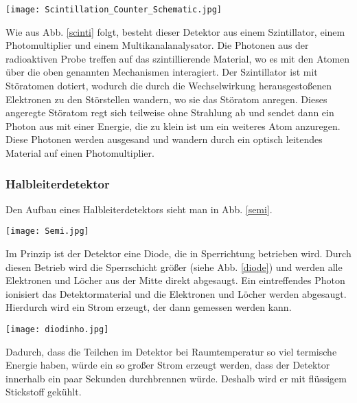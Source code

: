 \documentclass[12pt,a4paper,titlepage]{article}
\begin{document}
\begin{figure*}[h!]
	\centering
	\texttt{[image: Scintillation\_Counter\_Schematic.jpg]}\\
	\caption{Aufbau eines Szintillationsdetektors \cite{scinti}}
	\label{scinti}
\end{figure*}

Wie aus Abb. \ref{scinti} folgt, besteht dieser Detektor aus einem Szintillator, einem Photomultiplier und einem Multikanalanalysator. Die Photonen aus der radioaktiven Probe treffen auf das szintillierende Material, wo es mit den Atomen über die oben genannten Mechanismen interagiert. Der Szintillator ist mit Störatomen dotiert, wodurch die durch die Wechselwirkung herausgestoßenen Elektronen zu den Störstellen wandern, wo sie das Störatom anregen. Dieses angeregte Störatom regt sich teilweise ohne Strahlung ab und sendet dann ein Photon aus mit einer Energie, die zu klein ist um ein weiteres Atom anzuregen. Diese Photonen werden ausgesand und wandern durch ein optisch leitendes Material auf einen Photomultiplier. 
\newpage
\subsubsection{Halbleiterdetektor}

Den Aufbau eines Halbleiterdetektors sieht man in Abb. \ref{semi}. 

 \begin{figure*}[h!]
 	\centering
 	\texttt{[image: Semi.jpg]}\\
 	\caption{Aufbau eines Halbleiterdetektors \cite{semi}}
 	\label{semi}
 \end{figure*}

Im Prinzip ist der Detektor eine Diode, die in Sperrichtung betrieben wird. Durch diesen Betrieb wird die Sperrschicht größer (siehe Abb. \ref{diode}) und werden alle Elektronen und Löcher aus der Mitte direkt abgesaugt. Ein eintreffendes Photon ionisiert das Detektormaterial und die Elektronen und Löcher werden abgesaugt. Hierdurch wird ein Strom erzeugt, der dann gemessen werden kann.

 \begin{figure*}[h!]
	\centering
	\texttt{[image: diodinho.jpg]}\\
	\caption{Diode \cite{diode}}
	\label{diode}
\end{figure*}

Dadurch, dass die Teilchen im Detektor bei Raumtemperatur so viel termische Energie haben, würde ein so großer Strom erzeugt werden, dass der Detektor innerhalb ein paar Sekunden durchbrennen würde. Deshalb wird er mit flüssigem Stickstoff gekühlt. 
\end{document}
